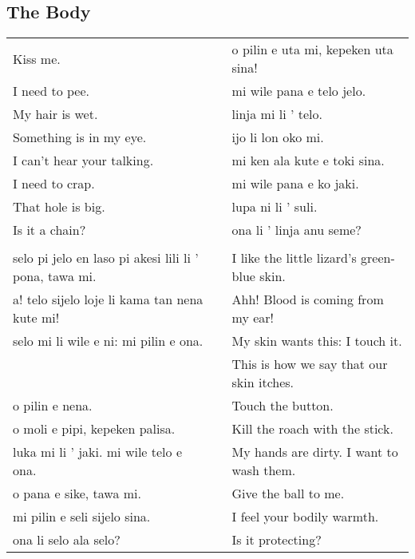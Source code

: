 \subsection*{The Body} 
\label{'the_body'}
%
\begin{supertabular}{p{5,5cm}|ll}
Kiss me.  && o pilin e uta mi, kepeken uta sina! \\ %
I need to pee.  && mi wile pana e telo jelo. \\ %
My hair is wet.  && linja mi li ' telo. \\ %
Something is in my eye.  && ijo li lon oko mi. \\ %
I can't hear your talking.  && mi ken ala kute e toki sina. \\ %
I need to crap.  && mi wile pana e ko jaki. \\ %
That hole is big.  && lupa ni li ' suli. \\ %
Is it a chain? && ona li ' linja anu seme? \\ %
 && \\ %
selo pi jelo en laso pi akesi lili li ' pona, tawa mi. && I like the little lizard's green-blue skin. \\ %
a! telo sijelo loje li kama tan nena kute mi!  && Ahh! Blood is coming from my ear! \\
selo mi li wile e ni: mi pilin e ona.  && My skin wants this: I touch it. \\
   && This is how we say that our skin itches. \\  %
o pilin e nena.  && Touch the button. \\
o moli e pipi, kepeken palisa.  && Kill the roach with the stick. \\
luka mi li ' jaki. mi wile telo e ona.  && My hands are dirty. I want to wash them. \\
o pana e sike, tawa mi.  && Give the ball to me. \\
mi pilin e seli sijelo sina.  && I feel your bodily warmth. \\
ona li selo ala selo? && Is it protecting? \\ 
\end{supertabular} 
%
\newpage
